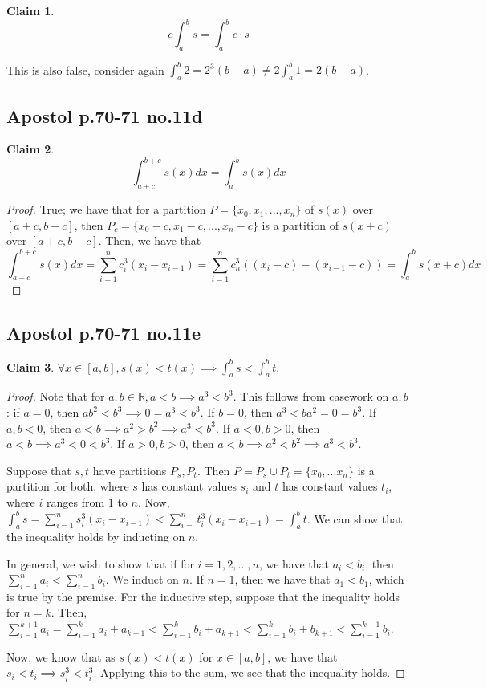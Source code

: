 \documentclass[12pt,letterpaper]{article}
\theoremstyle{definition}
\newtheorem*{claim}{Claim}
\newcommand{\R}{\mathbb{R}}
\begin{document}
\begin{claim}
  $$c\int_a^bs = \int_a^b c \cdot s $$
\end{claim}

This is also false, consider again $\int_a^b2 = 2^3(b-a) \neq 2\int_a^b 1 = 2(b-a)$.

\subsection*{Apostol p.70-71 no.11d}

\begin{claim}
  $$\int_{a+c}^{b+c} s(x)dx = \int_a^b s(x)dx $$
\end{claim}

\begin{proof}
  True; we have that for a partition $P = \{x_0, x_1,...,x_n\}$ of $s(x)$ over $[a+c,b+c]$, then $P_c =
  \{x_0 - c, x_1 - c,...,x_n - c\}$ is a partition of $s(x + c)$ over $[a+c,b+c]$.
  Then, we have that
  \[
    \int_{a+c}^{b+c}s(x)dx = \sum_{i=1}^nc_i^3(x_i - x_{i-1}) =
    \sum_{i=1}^nc_n^3((x_i - c) - (x_{i-1} - c)) = \int_a^bs(x + c)dx
  \]
\end{proof}

\subsection*{Apostol p.70-71 no.11e}

\begin{claim}
  $\forall x \in [a,b], s(x) < t(x) \implies \int_a^bs < \int_a^bt$.
\end{claim}

\begin{proof}
  Note that for $a,b \in \R, a < b \implies a^3 < b^3$. This follows from
  casework on $a,b$: if $a = 0$, then $ab^2 < b^3 \implies 0 = a^3 < b^3$. If $b
  = 0$, then $a^3 < ba^2 = 0 = b^3$. If $a, b < 0$, then $a < b \implies a^2 >
  b^2 \implies a^3 < b^3$. If $a < 0, b > 0$, then $a < b \implies a^3 < 0 <
  b^3$. If $a>0, b>0$, then $a<b \implies a^2 < b^2 \implies a^3 < b^3$.
    
  Suppose that $s,t$ have partitions $P_s, P_t$. Then $P = P_s \cup P_t = \{x_0,...x_n\}$ is a partition for both, where $s$ has constant values $s_i$ and $t$ has constant values $t_i$, where $i$ ranges from $1$ to $n$.
  Now, $\int_a^b s = \sum_{i=1}^n s_i^3(x_i - x_{i-1}) < \sum_{i=}^n t_i^3(x_i - x_{i-1}) = \int_a^b t$. We can show that the inequality holds by inducting on $n$. 
  
  In general, we wish to show that if for $i = 1,2,...,n$, we have that $a_i < b_i$, then $\sum_{i=1}^na_i < \sum_{i=1}^nb_i$. We induct on $n$. If $n = 1$, then we have that $a_1 < b_1$, which is true by the premise. For the inductive step, suppose that the inequality holds for $n = k$. Then,
  $\sum_{i=1}^{k+1}a_i = \sum_{i=1}^k a_i + a_{k+1} < \sum_{i=1}^k b_i + a_{k+1} < \sum_{i=1}^k b_i + b_{k+1} < \sum_{i=1}^{k+1} b_i$.
  
  Now, we know that as $s(x) < t(x)$ for $x \in [a,b]$, we have that $s_i < t_i \implies s_i^3 < t_i^3$. Applying this to the sum, we see that the inequality holds.
  
\end{proof}
\end{document}
